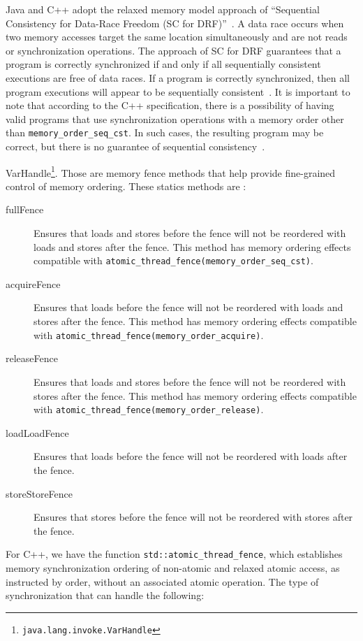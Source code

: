 Java and C++ adopt the relaxed memory model approach of ``Sequential Consistency for Data-Race Freedom (SC for DRF)''~\cite{DBLP_conf_isca_AdveH90}.  A data race occurs when two memory accesses target the same location simultaneously and are not reads or synchronization operations. The approach of SC for DRF guarantees that a program is correctly synchronized if and only if all sequentially consistent executions are free of data races. If a program is correctly synchronized, then all program executions will appear to be sequentially consistent~\cite{javamemorymodelspec}. It is important to note that according to the C++ specification, there is a possibility of having valid programs that use synchronization operations with a memory order other than \texttt{memory\_order\_seq\_cst}. In such cases, the resulting program may be correct, but there is no guarantee of sequential consistency~\cite{DBLP_conf_pldi_BoehmA08}.

VarHandle\footnote{\texttt{java.lang.invoke.VarHandle}}. Those are memory fence methods that help provide fine-grained control of memory ordering. These statics
methods are \cite{varHandleJdk92017}:

\begin{description}
\item[{fullFence}] Ensures that loads and stores before the fence will not be
reordered with loads and stores after the fence. This method has memory
ordering effects compatible with
\texttt{atomic\_thread\_fence(memory\_order\_seq\_cst)}.
\item[{acquireFence}] Ensures that loads before the fence will not be reordered
with loads and stores after the fence. This method has memory ordering
effects compatible with \texttt{atomic\_thread\_fence(memory\_order\_acquire)}.
\item[{releaseFence}] Ensures that loads and stores before the fence will not
be reordered with stores after the fence. This method has memory ordering
effects compatible with \texttt{atomic\_thread\_fence(memory\_order\_release)}.
\item[{loadLoadFence}] Ensures that loads before the fence will not be
reordered with loads after the fence.
\item[{storeStoreFence}] Ensures that stores before the fence will not be
reordered with stores after the fence.
\end{description}

For C++, we have the function
\texttt{std::atomic\_thread\_fence}\cite{threadFenceCpp2020}, which establishes
memory synchronization ordering of non-atomic and relaxed atomic access, as
instructed by order, without an associated atomic operation. The type of
synchronization that can handle the following:

